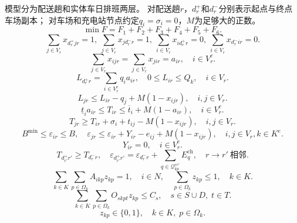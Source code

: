 \documentclass{setp-new}
\begin{document}
模型分为配送趟和实体车日排班两层。
对配送趟$r$，$d_r^+$和$d_r^-$分别表示起点与终点车场副本；
对车场和充电站节点约定$q_i=\sigma_i=0$，$M$为足够大的正数。
\begin{equation}
\min F=F_1+F_2+F_3+F_4+F_5+F_6. \label{eq:obj}
\end{equation}
\begin{equation}
\sum_{j\in V_r}x_{d_r^+jr}=1,\ \sum_{j\in V_r}x_{jd_r^-r}=1,\ \sum_{i\in V_r}x_{id_r^+r}=0,\ \sum_{i\in V_r}x_{d_r^-ir}=0.
\label{eq:trip_flow}
\end{equation}
\begin{equation}
\sum_{j\in V_r}x_{ijr}=\sum_{j\in V_r}x_{jir}=a_{ir},\quad i\in V_r^c.
\label{eq:flow_cons}
\end{equation}
\begin{equation}
L_{d_r^+r}=\sum_{i\in V_r^c}q_i a_{ir},\quad 0\le L_{ir}\le Q_k,\quad i\in V_r.
\label{eq:load_bounds}
\end{equation}
\begin{equation}
L_{jr}\le L_{ir}-q_j+M(1-x_{ijr}),\quad i,j\in V_r.
\label{eq:load_prop}
\end{equation}
\begin{equation}
\underline t_i a_{ir}\le T_{ir}\le\overline t_i+M(1-a_{ir}),\quad i\in V_r^c.
\label{eq:tw}
\end{equation}
\begin{equation}
T_{jr}\ge T_{ir}+\sigma_i+t_{ij}-M(1-x_{ijr}),\quad i,j\in V_r.
\label{eq:time_prop}
\end{equation}
\begin{equation}
B^{\min}\le\varepsilon_{ir}\le B,\quad
\varepsilon_{jr}\le\varepsilon_{ir}+Y_{ir}-e_{ij}+M(1-x_{ijr}),\quad
i,j\in V_r, k\in K^e.
\label{eq:batt_prop}
\end{equation}
\begin{equation}
Y_{ir}=0,\quad i\in V_r^c.
\label{eq:no_customer_charge}
\end{equation}
\begin{equation}
T_{d_{r'}^+r'}\ge T_{d_r^-r},\quad
\varepsilon_{d_{r'}^+r'}=\varepsilon_{d_r^-r}+\sum_{q\in\mathcal Q_{kp}^{rr'}}E_q^{\mathrm{ch}},\quad r\to r'\ \text{相邻}.
\label{eq:trip_linkage}
\end{equation}
\begin{equation}
\sum_{k\in K}\sum_{p\in\Omega_k}A_{ikp}z_{kp}=1,\quad i\in N,\quad
\sum_{p\in\Omega_k}z_{kp}\le1,\quad k\in K.
\label{eq:coverage}
\end{equation}
\begin{equation}
\sum_{k\in K}\sum_{p\in\Omega_k}O_{skpt}z_{kp}\le C_s,\quad s\in S\cup D,\;t\in T.
\label{eq:station_cap}
\end{equation}
\begin{equation}
z_{kp}\in\{0,1\},\quad k\in K,\;p\in\Omega_k.
\label{eq:binary}
\end{equation}
\end{document}
